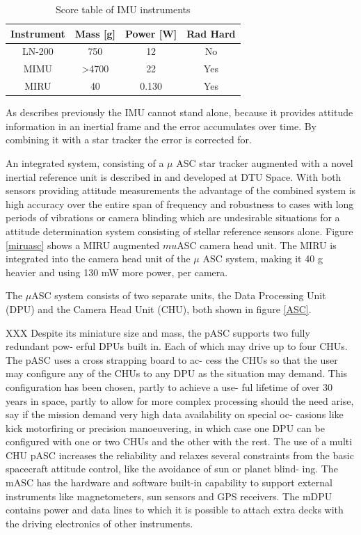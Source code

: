 \begin{table}[H]
\begin{center}
\begin{tabular}{|c|c|c|c|}
\hline 
Instrument & Mass [g] & Power [W] &Rad Hard \\ 
\hline
LN-200 & 750 & 12 & No\\
\hline
MIMU & >4700 & 22 & Yes\\
\hline

MIRU & 40 & 0.130 & Yes\\
\hline

\end{tabular}
\caption{Score table of IMU instruments}
\label{tab:IMU}

\end{center}
\end{table}

As describes previously the IMU cannot stand alone, because it provides attitude information in an inertial frame and the error accumulates over time. By combining it with a star tracker the error is corrected for. 


An integrated system, consisting of a $\mu$ ASC star tracker augmented with a novel inertial reference unit is described in \cite{Bjarno} and developed at DTU Space. With both sensors providing attitude measurements the advantage of the combined system is high accuracy over the entire span of frequency and robustness to cases with long periods of vibrations or camera blinding which are undesirable situations for a attitude determination system consisting of stellar reference sensors alone. Figure \ref{miruasc} shows a MIRU augmented $mu$ASC camera head unit. The MIRU is integrated into the camera head unit of the $\mu$ ASC system, making it 40 g heavier and using 130 mW more power, per camera. 



The $\mu$ASC system consists of two separate units, the Data Processing Unit (DPU) and the Camera Head Unit (CHU),  both shown in figure \ref{ASC}. 

XXX
 Despite its miniature size and mass, the pASC supports two fully redundant pow- erful DPUs built in. Each of which may drive up to four CHUs. The pASC uses a cross strapping board to ac- cess the CHUs so that the user may configure any of the CHUs to any  DPU as the  situation may demand. This configuration has been chosen, partly to achieve a  use- ful lifetime of over 30 years in space, partly to allow for more complex processing should the need arise, say if the mission demand very high data availability on special oc- casions like kick motorfiring or precision manoeuvering, in which case one DPU can be configured with one or two CHUs and the other with the rest. The use of a multi CHU pASC increases the reliability and relaxes several constraints from the basic spacecraft attitude control, like the avoidance of sun or planet blind- ing.
The mASC has the hardware and software built-in capability to support external instruments
like magnetometers, sun sensors and GPS receivers.
The mDPU contains power and data lines to which it is possible to attach extra decks with
the driving electronics of other instruments.


